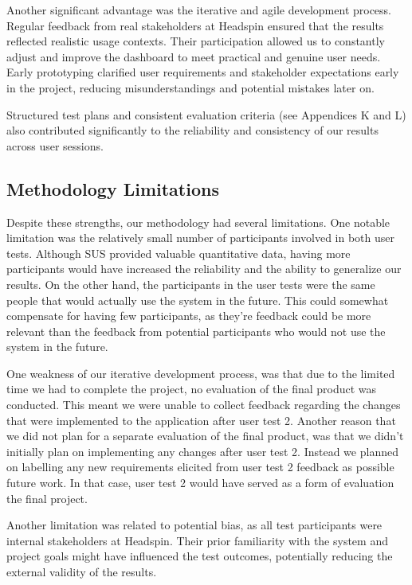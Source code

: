 Another significant advantage was the iterative and agile development process. Regular feedback from real stakeholders at Headspin ensured that the results reflected realistic usage contexts. Their participation allowed us to constantly adjust and improve the dashboard to meet practical and genuine user needs. Early prototyping clarified user requirements and stakeholder expectations early in the project, reducing misunderstandings and potential mistakes later on.

Structured test plans and consistent evaluation criteria (see Appendices K and L) also contributed significantly to the reliability and consistency of our results across user sessions.


\subsection{Methodology Limitations}
Despite these strengths, our methodology had several limitations. One notable limitation was the relatively small number of participants involved in both user tests. Although SUS provided valuable quantitative data, having more participants would have increased the reliability and the ability to generalize our results. On the other hand, the participants in the user tests were the same people that would actually use the system in the future. This could somewhat compensate for having few participants, as they're feedback could be more relevant than the feedback from potential participants who would not use the system in the future.

One weakness of our iterative development process, was that due to the limited time we had to complete the project, no evaluation of the final product was conducted. This meant we were unable to collect feedback regarding the changes that were implemented to the application after user test 2. Another reason that we did not plan for a separate evaluation of the final product, was that we didn't initially plan on implementing any changes after user test 2. Instead we planned on labelling any new requirements elicited from user test 2 feedback as possible future work. In that case, user test 2 would have served as a form of evaluation the final project. 

Another limitation was related to potential bias, as all test participants were internal stakeholders at Headspin. Their prior familiarity with the system and project goals might have influenced the test outcomes, potentially reducing the external validity of the results.

